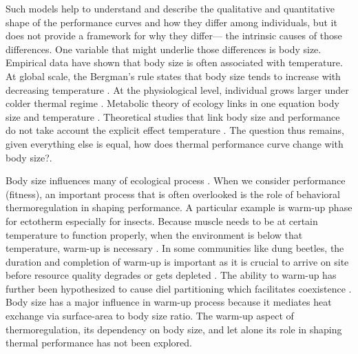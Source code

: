 Such models help to understand and describe the qualitative and quantitative shape of the performance curves and how they differ among individuals, but it does not provide a framework for why they differ--- the intrinsic causes of those differences. %
One variable that might underlie those differences is body size.
Empirical data have shown that body size is often associated with temperature.  
At global scale, the Bergman's rule states that body size tends to increase with decreasing temperature \citep{Bergman1847}.
At the physiological level, individual grows larger under colder thermal regime \citep{Van1996}.
Metabolic theory of ecology links in one equation body size and temperature \citep{Gillooly2001}.
Theoretical studies that link body size and performance do not take account the explicit effect temperature \citep[e.g.,][]{Yodzis1992, Brown1993}.
The question thus remains, given everything else is equal, how does thermal performance curve change with body size?.

Body size influences many of ecological process \citep{Peters1986}.
When we consider performance (fitness), an important process that is often overlooked is the role of behavioral thermoregulation in shaping performance. 
A particular example is warm-up phase for ectotherm especially for insects.
Because muscle needs to be at certain temperature to function properly, when the environment is below that temperature, warm-up is necessary \citep[e.g.,][]{Heinrich1975}. 
In some communities like dung beetles, the duration and completion of warm-up is important as it is crucial to arrive on site before resource quality degrades or gets depleted \citep{Hanski1991}. %
The ability to warm-up has further been hypothesized to cause diel partitioning which facilitates coexistence \citep{Viljanen2009}.
Body size has a major influence in warm-up process because it mediates heat exchange via surface-area to body size ratio.
The warm-up aspect of thermoregulation, its dependency on body size, and let alone its role in shaping thermal performance has not been explored.
 
